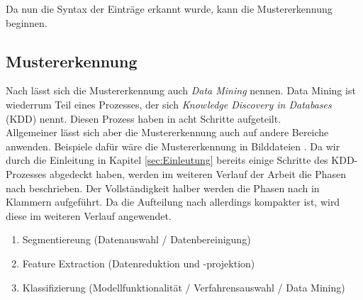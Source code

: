 Da nun die Syntax der Einträge erkannt wurde, kann die Mustererkennung beginnen.


\subsection{Mustererkennung}
\label{sub:Mustererkennung}
Nach \citet{BeKe19} lässt sich die Mustererkennung auch \textit{Data Mining} nennen. Data Mining ist wiederrum Teil eines Prozesses, der sich \textit{Knowledge Discovery in Databases} (KDD) nennt. Diesen Prozess haben \citet{BeKe19} in acht Schritte aufgeteilt.\\
Allgemeiner lässt sich aber die Mustererkennung auch auf andere Bereiche anwenden. Beispiele dafür wäre die Mustererkennung in Bilddateien \citep{DuHaSt01}. Da wir durch die Einleitung in Kapitel \ref{sec:Einleutung} bereits einige Schritte des KDD-Prozesses abgedeckt haben, werden im weiteren Verlauf der Arbeit die Phasen nach \citet{Wa11} beschrieben. Der Vollständigkeit halber werden die Phasen nach \citet{BeKe19} in Klammern aufgeführt. Da die Aufteilung nach \citet{Wa11} allerdings kompakter ist, wird diese im weiteren Verlauf angewendet.
\begin{enumerate}
	\item Segmentiereung (Datenauswahl / Datenbereinigung)
	\item Feature Extraction (Datenreduktion und -projektion)
	\item Klassifizierung (Modellfunktionalität / Verfahrensauswahl / Data Mining)
\end{enumerate}

